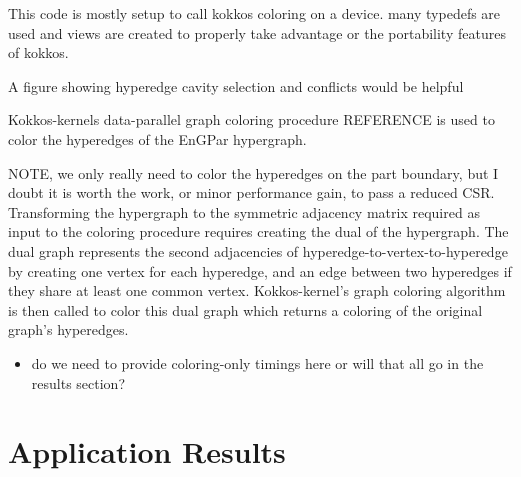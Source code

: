 \documentclass[graybox]{svmult}
\begin{document}
This code is mostly setup to call kokkos coloring on a device. many typedefs are
used and views are created to properly take advantage or the portability
features of kokkos.

{\color{red}A figure showing hyperedge cavity selection and conflicts would be
helpful}

Kokkos-kernels data-parallel graph coloring procedure REFERENCE is used to
color the hyperedges of the EnGPar hypergraph.

{\color{red}NOTE, we only really need to color the hyperedges on the part boundary,
but I doubt it is worth the work, or minor performance gain, to pass a reduced CSR.}
Transforming the hypergraph to the symmetric adjacency matrix required as input
to the coloring procedure requires creating the dual of the hypergraph.
The dual graph represents the second adjacencies of
hyperedge-to-vertex-to-hyperedge by creating one vertex for each hyperedge, and
an edge between two hyperedges if they share at least one common vertex.
Kokkos-kernel's graph coloring algorithm is then called to color this dual graph
which returns a coloring of the original graph's hyperedges.

\begin{itemize}
  \item do we need to provide coloring-only timings here or will that all go in
    the results section?
\end{itemize}

\section{Application Results} \label{sec:results}
\end{document}

